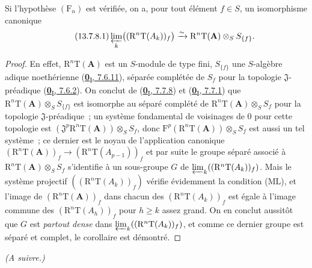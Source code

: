 \begin{corollary}[13.7.8]
\label{0.13.7.8-fr}
Si l'hypothèse $(\mathrm F_n)$ est vérifiée, on a, pour tout élément $f\in S$,
un isomorphisme canonique
\begin{equation}
\label{0.13.7.8.1-fr}
\tag{13.7.8.1}
\varprojlim_k\bigl((\mathrm R^n\mathrm T(A_k))_f\bigr)
\xrightarrow{\sim}\mathrm R^n\mathrm T(\mathbf A)\otimes_S S_{\{f\}}.
\end{equation}
\end{corollary}

\begin{proof}
En effet, $\mathrm R^n\mathrm T(\mathbf A)$ est un $S$-module de type fini,
$S_{\{f\}}$ une $S$-algèbre adique noethérienne
(\hyperref[0.7.6.11-fr]{\textbf{0}\textsubscript{I}, 7.6.11}), séparée complétée de
$S_f$ pour la topologie $\mathfrak J$-préadique
(\hyperref[0.7.6.2-fr]{\textbf{0}\textsubscript{I}, 7.6.2}). On conclut de
(\hyperref[0.7.7.8-fr]{\textbf{0}\textsubscript{I}, 7.7.8}) et
(\hyperref[0.7.7.1-fr]{\textbf{0}\textsubscript{I}, 7.7.1}) que
$\mathrm R^n\mathrm T(\mathbf A)\otimes_S S_{\{f\}}$ est isomorphe au séparé
complété de $\mathrm R^n\mathrm T(\mathbf A)\otimes_S S_f$ pour la topologie
$\mathfrak J$-préadique~; un système fondamental de voisinages de $0$ pour
cette topologie est
$(\mathfrak J^p\mathrm R^n\mathrm T(\mathbf A))\otimes_S S_f$, donc
$\mathrm F^p(\mathrm R^n\mathrm T(\mathbf A))\otimes_S S_f$ est aussi un tel
système~; ce dernier est le noyau de l'application canonique
$(\mathrm R^n\mathrm T(\mathbf A))_f\to
(\mathrm R^n\mathrm T(A_{p-1}))_f$ et par suite le groupe séparé associé à
$\mathrm R^n\mathrm T(\mathbf A)\otimes_S S_f$ s'identifie à un sous-groupe
$G$ de $\varprojlim_k((\mathrm R^n\mathrm T(A_k))_f)$. Mais le système
projectif $((\mathrm R^n\mathrm T(A_k))_f)$ vérifie évidemment la condition
(ML), et l'image de $(\mathrm R^n\mathrm T(\mathbf A))_f$ dans chacun des
$(\mathrm R^n\mathrm T(A_k))_f$ est égale à l'image commune des
$(\mathrm R^n\mathrm T(A_h))_f$ pour $h\geq k$ assez grand. On en conclut
aussitôt que $G$ est \emph{partout dense} dans
$\varprojlim_k((\mathrm R^n\mathrm T(A_k))_f)$, et comme ce dernier groupe est
séparé et complet, le corollaire est démontré.
\end{proof}

\begin{flushright}
\textit{(A suivre.)}
\end{flushright}

\clearpage
{}
\thispagestyle{empty}
\null
\clearpage
\thispagestyle{plain}
\label{chapter:III-fr}

